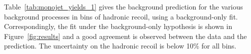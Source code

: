 % 

Table~\ref{tab:monojet_yields_1} gives the background prediction for the various background processes in bins of hadronic recoil, using a background-only fit. Correspondingly, the fit under the background-only hypothesis is shown in Figure~\ref{fig:results} and a good agreement is observed between the data and the prediction. The uncertainty on the hadronic recoil is below 10\% for all bins.


